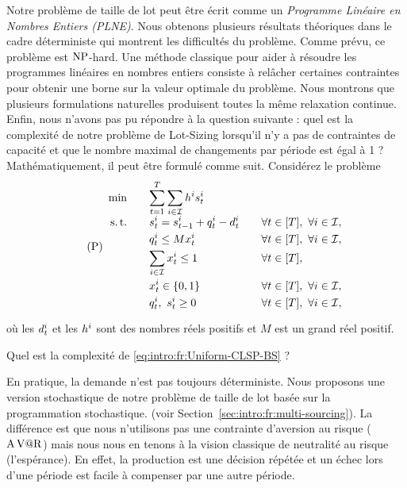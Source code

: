 Notre problème de taille de lot peut être écrit comme un \emph{Programme Linéaire en Nombres Entiers (PLNE)}.
Nous obtenons plusieurs résultats théoriques dans le cadre déterministe qui montrent les difficultés du problème.
Comme prévu, ce problème est $\operatorname{NP}$-hard.
Une méthode classique pour aider à résoudre les programmes linéaires en nombres entiers consiste à relâcher certaines contraintes pour obtenir une borne sur la valeur optimale du problème.
Nous montrons que plusieurs formulations naturelles produisent toutes la même relaxation continue.
Enfin, nous n'avons pas pu répondre à la question suivante : quel est la complexité de notre problème de Lot-Sizing lorsqu'il n'y a pas de contraintes de capacité et que le nombre maximal de changements par période est égal à 1 ?
Mathématiquement, il peut être formulé comme suit.
Considérez le problème
\begin{equation}\tag{P}\label{eq:intro:fr:Uniform-CLSP-BS}
  \begin{array}{rlll}
    \min\quad & \ds \sum_{t=1}^{\horizon} \sum_{i\in\REF} \holding^i \inventory_t^i
    \\ \smallskip
    \st\quad & \ds \inventory_t^i = \inventory_{t-1}^i + \quantity_t^i - \demand_t^i && \forall t\in\range{\horizon},\ \forall i\in\REF,
    \\ \smallskip
    & \ds \quantity_t^i \le M\setup_t^i && \forall t\in\range{\horizon},\ \forall i\in\REF,
    \\ \smallskip
    & \ds \sum_{i\in\REF} \setup_t^i \le 1 && \forall t\in\range{\horizon},
    \\ \smallskip
    & \ds \setup_t^i \in \crbracket{0,1} && \forall t\in\range{\horizon},\ \forall i\in\REF,
    \\ \smallskip
    & \ds \quantity_t^i,\ \inventory_t^i \ge 0 && \forall t\in\range{\horizon},\ \forall i\in\REF,
  \end{array}
\end{equation}
où les $d_t^i$ et les $h^i$ sont des nombres réels positifs et $M$ est un grand réel positif.
\begin{question}
Quel est la complexité de \eqref{eq:intro:fr:Uniform-CLSP-BS} ?
\end{question}


\medskip


En pratique, la demande n'est pas toujours déterministe.
Nous proposons une version stochastique de notre problème de taille de lot basée sur la programmation stochastique. (voir Section~\ref{sec:intro:fr:multi-sourcing}).
La différence est que nous n'utilisons pas une contrainte d'aversion au risque ($\operatorname{A\operatorname{V@R}}$) mais nous nous en tenons à la vision classique de neutralité au risque (l'espérance).
En effet, la production est une décision répétée et un échec lors d'une période est facile à compenser par une autre période.


